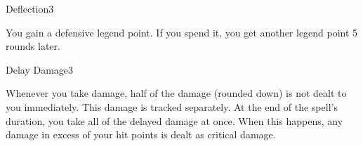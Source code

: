 \begin{spellsection}{Deflection}{3}
    \begin{spellheader}
    \end{spellheader}
    \begin{spellcontent}
        \begin{spelltargetinginfo}
        \end{spelltargetinginfo}
        \begin{spelleffects}
            \spelleffect You gain a defensive legend point. If you spend it, you get another legend point 5 rounds later.
            \spelldur \durlong
        \end{spelleffects}
    \end{spellcontent}
    \begin{spellfooter}
        \miscastexplode
    \end{spellfooter}
\end{spellsection}

\begin{spellsection}{Delay Damage}{3}
    \begin{spellheader}
    \end{spellheader}
    \begin{spellcontent}
        \begin{spelltargetinginfo}
        \end{spelltargetinginfo}
        \begin{spelleffects}
            \spelleffect Whenever you take damage, half of the damage (rounded down) is not dealt to you immediately. This damage is tracked separately. At the end of the spell's duration, you take all of the delayed damage at once. When this happens, any damage in excess of your hit points is dealt as critical damage.
            \spelldur \durmed
        \end{spelleffects}
        \begin{spellfooter}
            \miscastexplode
        \end{spellfooter}
    \end{spellcontent}
\end{spellsection}

